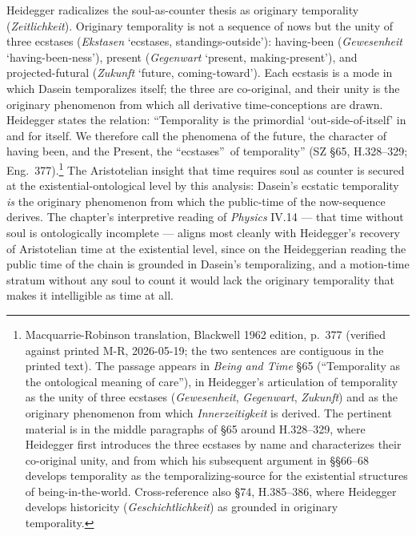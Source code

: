 \documentclass{article}
\begin{document}
Heidegger radicalizes the soul-as-counter thesis as originary temporality (\textit{Zeitlichkeit}). Originary temporality is not a sequence of nows but the unity of three ecstases (\textit{Ekstasen} `ecstases, standings-outside'): having-been (\textit{Gewesenheit} `having-been-ness'), present (\textit{Gegenwart} `present, making-present'), and projected-futural (\textit{Zukunft} `future, coming-toward'). Each ecstasis is a mode in which Dasein temporalizes itself; the three are co-original, and their unity is the originary phenomenon from which all derivative time-conceptions are drawn. Heidegger states the relation: ``Temporality is the primordial `out-side-of-itself' in and for itself. We therefore call the phenomena of the future, the character of having been, and the Present, the \textquotedblleft ecstases\textquotedblright\ of temporality'' (SZ \S 65, H.328--329; Eng.~377).\footnote{Macquarrie-Robinson translation, Blackwell 1962 edition, p.~377 (verified against printed M-R, 2026-05-19; the two sentences are contiguous in the printed text). The passage appears in \textit{Being and Time} \S 65 (``Temporality as the ontological meaning of care''), in Heidegger's articulation of temporality as the unity of three ecstases (\textit{Gewesenheit}, \textit{Gegenwart}, \textit{Zukunft}) and as the originary phenomenon from which \textit{Innerzeitigkeit} is derived. The pertinent material is in the middle paragraphs of \S 65 around H.328--329, where Heidegger first introduces the three ecstases by name and characterizes their co-original unity, and from which his subsequent argument in \S\S 66--68 develops temporality as the temporalizing-source for the existential structures of being-in-the-world. Cross-reference also \S 74, H.385--386, where Heidegger develops historicity (\textit{Geschichtlichkeit}) as grounded in originary temporality.} The Aristotelian insight that time requires soul as counter is secured at the existential-ontological level by this analysis: Dasein's ecstatic temporality \textit{is} the originary phenomenon from which the public-time of the now-sequence derives. The chapter's interpretive reading of \textit{Physics} IV.14 --- that time without soul is ontologically incomplete --- aligns most cleanly with Heidegger's recovery of Aristotelian time at the existential level, since on the Heideggerian reading the public time of the chain is grounded in Dasein's temporalizing, and a motion-time stratum without any soul to count it would lack the originary temporality that makes it intelligible as time at all.
\end{document}
